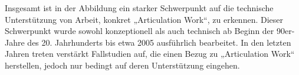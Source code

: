 Insgesamt ist in der Abbildung ein starker Schwerpunkt auf die technische Unterstützung von Arbeit, konkret „Articulation Work“, zu erkennen. Dieser Schwerpunkt wurde sowohl konzeptionell als auch technisch ab Beginn der 90er-Jahre des 20. Jahrhunderts bis etwa 2005 ausführlich bearbeitet. In den letzten Jahren treten verstärkt Fallstudien auf, die einen Bezug zu „Articulation Work“ herstellen, jedoch nur bedingt auf deren Unterstützung eingehen.


